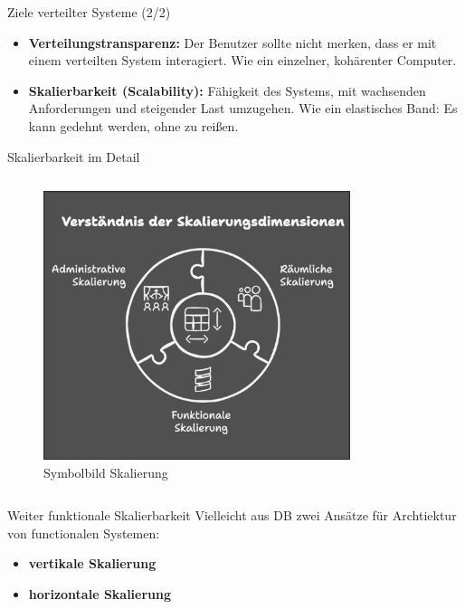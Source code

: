 \documentclass{beamer}
\begin{document}
\begin{frame}{Ziele verteilter Systeme (2/2)}
    \begin{itemize}
        \item \textbf{Verteilungstransparenz:}  Der Benutzer sollte nicht merken, dass er mit einem verteilten System interagiert.  Wie ein einzelner, kohärenter Computer.        
        \item \textbf{Skalierbarkeit (Scalability):}  Fähigkeit des Systems, mit wachsenden Anforderungen und steigender Last umzugehen.  Wie ein elastisches Band: Es kann gedehnt werden, ohne zu reißen.
    \end{itemize}
\end{frame}


\begin{frame}{Skalierbarkeit im Detail}
    \begin{columns}[c] %

        \begin{column}[c]{0.9\textwidth}
            \begin{figure}
                \centering
                
                    \includegraphics[width=0.8\textwidth]{fig/Skalierung.png}
           
                \caption{Symbolbild Skalierung}
            \end{figure}
        \end{column}

    \end{columns}
\end{frame}

\begin{frame}{Weiter funktionale Skalierbarkeit}
    Vielleicht aus DB zwei Ansätze für Archtiektur von functionalen Systemen:
    \begin{itemize}
    \item \textbf{vertikale Skalierung}
    \item \textbf{horizontale Skalierung}
    \end{itemize}
\end{frame}
\end{document}
